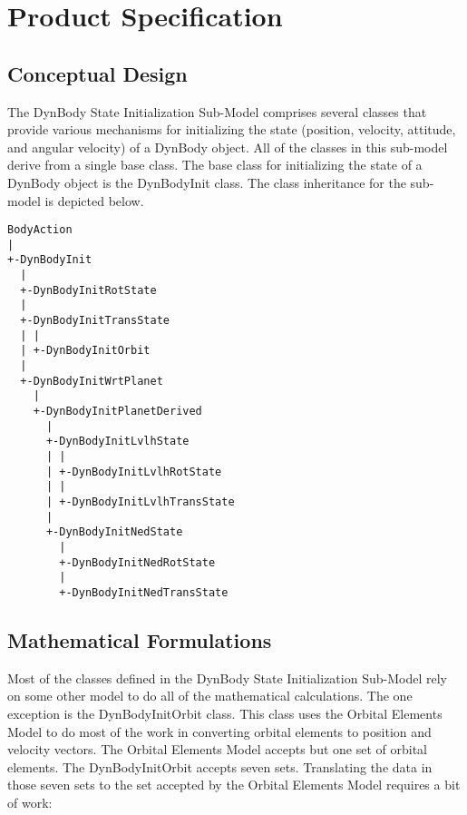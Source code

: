 %

\chapter{Product Specification}\label{ch:\modelpartid:spec}

\section{Conceptual Design}

The DynBody State Initialization Sub-Model comprises several classes that
provide various mechanisms for initializing the state
(position, velocity, attitude, and angular velocity) of
a DynBody object. All of the classes in this sub-model derive from
a single base class. The base class for initializing the state of a DynBody
object is the DynBodyInit class. The class inheritance for the sub-model
is depicted below.

\begin{verbatim}
BodyAction
|
+-DynBodyInit
  |
  +-DynBodyInitRotState
  |
  +-DynBodyInitTransState
  | |
  | +-DynBodyInitOrbit
  |
  +-DynBodyInitWrtPlanet
    |
    +-DynBodyInitPlanetDerived
      |
      +-DynBodyInitLvlhState
      | |
      | +-DynBodyInitLvlhRotState
      | |
      | +-DynBodyInitLvlhTransState
      |
      +-DynBodyInitNedState
        |
        +-DynBodyInitNedRotState
        |
        +-DynBodyInitNedTransState
\end{verbatim}


\section{Mathematical Formulations}
Most of the classes defined in the DynBody State Initialization Sub-Model
rely on some other model to do all of the mathematical calculations.
The one exception is the DynBodyInitOrbit class. This class uses the
Orbital Elements Model to do most of the work in converting orbital elements
to position and velocity vectors. The Orbital Elements Model accepts but
one set of orbital elements. The DynBodyInitOrbit accepts seven sets.
Translating the data in those seven sets to the set accepted by the
Orbital Elements Model requires a bit of work\cite{Vallado}:

